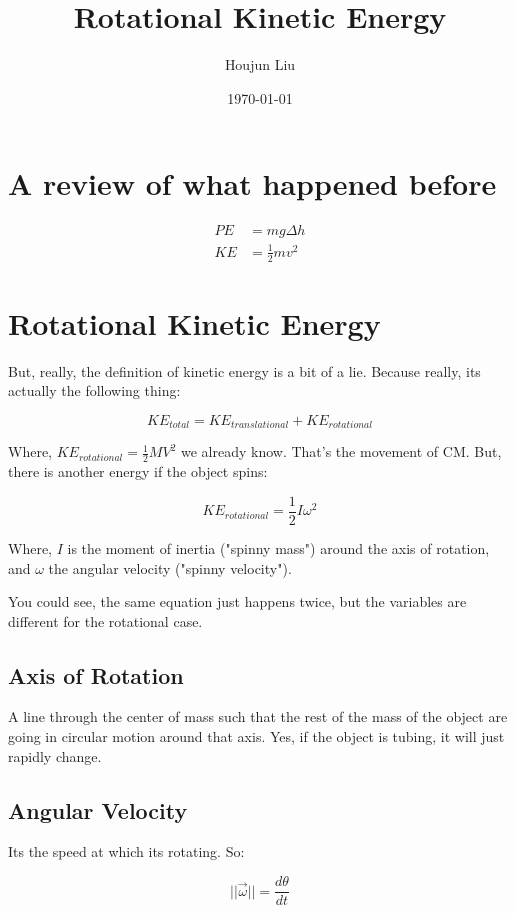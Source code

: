 \documentclass[letterpaper]{article}
\author{Houjun Liu}
\date{\today}
\title{Rotational Kinetic Energy}
\renewcommand{\tableofcontents}{}
\begin{document}
\tableofcontents


\section{A review of what happened before}
\label{sec:org7fa2e5b}

\begin{align}
PE &= mg \Delta h \\
KE &= \frac{1}{2} mv^2
\end{align}

\section{Rotational Kinetic Energy}
\label{sec:org6b3ef0c}
But, really, the definition of kinetic energy is a bit of a lie. Because really, its actually the following thing:

\begin{equation}
KE_{total} = KE_{translational} + KE_{rotational}
\end{equation}

Where, \(KE_{rotational} = \frac{1}{2}MV^2\) we already know. That's the movement of CM. But, there is another energy if the object spins:

\begin{equation}
KE_{rotational} = \frac{1}{2}I\omega^2
\end{equation}

Where, \(I\) is the moment of inertia ("spinny mass") around the axis of rotation, and \(\omega\) the angular velocity ("spinny velocity").

You could see, the same equation just happens twice, but the variables are different for the rotational case.


\subsection{Axis of Rotation}
\label{sec:org02310cf}
A line through the center of mass such that the rest of the mass of the object are going in circular motion around that axis. Yes, if the object is tubing, it will just rapidly change.

\subsection{Angular Velocity}
\label{sec:org185eb41}
Its the speed at which its rotating. So:

\begin{equation}
||\vec{\omega}|| = \frac{d\theta}{dt}
\end{equation}
\end{document}
